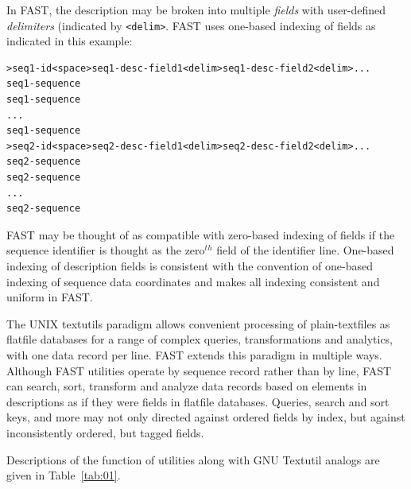 \documentclass{frontiersSCNS} %
\begin{document}
In FAST, the description may be broken into multiple {\it fields} with
user-defined {\it delimiters} (indicated by {\tt <delim>}. FAST uses
one-based indexing of fields as indicated in this example:

\begin{verbatim}
>seq1-id<space>seq1-desc-field1<delim>seq1-desc-field2<delim>...
seq1-sequence
seq1-sequence
...
seq1-sequence
>seq2-id<space>seq2-desc-field1<delim>seq2-desc-field2<delim>...
seq2-sequence
seq2-sequence
...
seq2-sequence
\end{verbatim}

FAST may be thought of as compatible with zero-based indexing of
fields if the sequence identifier is thought as the zero$^{th}$ field
of the identifier line. One-based indexing of description fields is
consistent with the convention of one-based indexing of sequence data
coordinates and makes all indexing consistent and uniform in FAST.

The UNIX textutils paradigm allows convenient processing of
plain-textfiles as flatfile databases for a range of complex queries,
transformations and analytics, with one data record per line.  FAST
extends this paradigm in multiple ways. Although FAST utilities
operate by sequence record rather than by line, FAST can search, sort,
transform and analyze data records based on elements in descriptions
as if they were fields in flatfile databases. Queries, search and sort
keys, and more may not only directed against ordered fields by index,
but against inconsistently ordered, but tagged fields.

Descriptions of the function of utilities along
with GNU Textutil analogs are given in Table~\ref{tab:01}.
\end{document}
